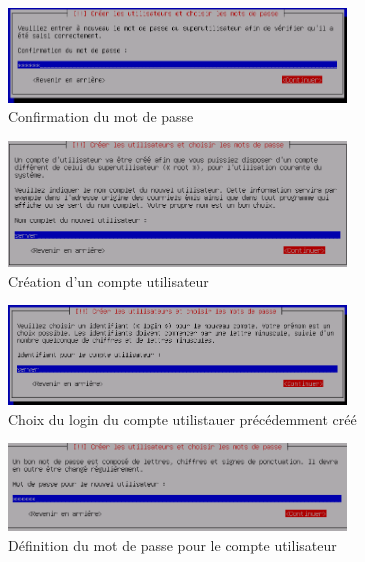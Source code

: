 \documentclass[11pt,a4paper,titlepage, oneside]{article}
\begin{document}
		\begin{figure}[htp]
                        \centering
                        \includegraphics[width=0.8\textwidth,natwidth=610,natheight=642]{images/debian7.png}
                        \caption{Confirmation du mot de passe}
		\end{figure}
	 
		\begin{figure}[htp]
                        \centering
                        \includegraphics[width=0.8\textwidth,natwidth=610,natheight=642]{images/debian8.png}
                        \caption{Création d'un compte utilisateur}
		\end{figure}
	 
		\begin{figure}[htp]
                        \centering
                        \includegraphics[width=0.8\textwidth,natwidth=610,natheight=642]{images/debian9.png}
                        \caption{Choix du login du compte utilistauer précédemment créé}
		\end{figure}

		\begin{figure}[htp]
                        \centering
                        \includegraphics[width=0.8\textwidth,natwidth=610,natheight=642]{images/debian10.png}
                        \caption{Définition du mot de passe pour le compte utilisateur}
		\end{figure}
	
\end{document}
